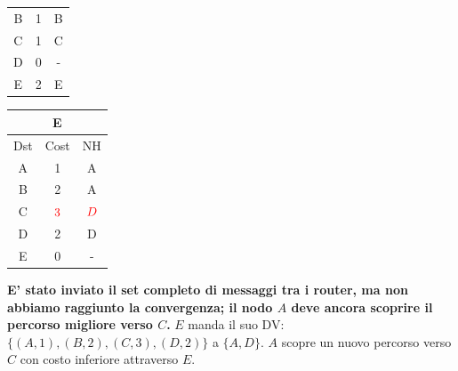 \documentclass[10pt]{article}
\begin{document}
\begin{table}[h!]
\begin{tabular}{|c||c||c|}
 			B & 1 & B \\
 			C & 1 & C \\
 			D & 0 & - \\
 			E & 2 & E \\
 			\hline
		\end{tabular}
		\begin{tabular}{|c||c||c|}
 			\hline
	 		\multicolumn{3}{|c|}{E} \\
 			\hline
 			Dst & Cost & NH\\
 			\hline
 			A & 1 & A \\
 			B & 2 & A \\
 			C & $\color{red} 3$ & $\color{red} D$ \\
 			D & 2 & D \\
 			E & 0 & - \\
 			\hline
		\end{tabular}
	\end{table}
	\newline \newline
	\textbf{E' stato inviato il set completo di messaggi tra i router, ma non abbiamo raggiunto la convergenza; il nodo $A$ deve ancora scoprire il percorso migliore verso $C$.}
	\newline \newline \newline
	$E$ manda il suo DV: $\{(A,1),(B,2),(C,3),(D,2)\}$ a $\{A,D\}$.
	\newline
	$A$ scopre un nuovo percorso verso $C$ con costo inferiore attraverso $E$.
\end{document}
